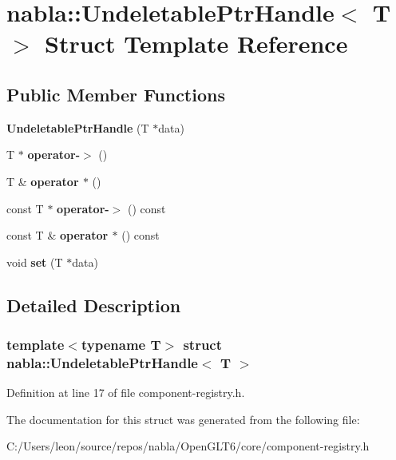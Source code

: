 \hypertarget{structnabla_1_1_undeletable_ptr_handle}{}\section{nabla\+::Undeletable\+Ptr\+Handle$<$ T $>$ Struct Template Reference}
\label{structnabla_1_1_undeletable_ptr_handle}
\subsection*{Public Member Functions}
\begin{DoxyCompactItemize}
\item 
\mbox{\label{structnabla_1_1_undeletable_ptr_handle_afd1796a0e126eefde86a3cfd2f166238}} 
{\bfseries Undeletable\+Ptr\+Handle} (T $\ast$data)
\item 
\mbox{\label{structnabla_1_1_undeletable_ptr_handle_ac8a3d97fd2186ea1d1c48041dc4fedcf}} 
T $\ast$ {\bfseries operator-\/$>$} ()
\item 
\mbox{\label{structnabla_1_1_undeletable_ptr_handle_a0d2936bd624f9b93e5772111525dab7b}} 
T \& {\bfseries operator $\ast$} ()
\item 
\mbox{\label{structnabla_1_1_undeletable_ptr_handle_a6254f505504dd4ee4d560305988e124c}} 
const T $\ast$ {\bfseries operator-\/$>$} () const
\item 
\mbox{\label{structnabla_1_1_undeletable_ptr_handle_a1cce9ea2ea5c3cb103f59c335267e7e7}} 
const T \& {\bfseries operator $\ast$} () const
\item 
\mbox{\label{structnabla_1_1_undeletable_ptr_handle_abcc6e0af30f6f48f38a7319c5e282331}} 
void {\bfseries set} (T $\ast$data)
\end{DoxyCompactItemize}


\subsection{Detailed Description}
\subsubsection*{template$<$typename T$>$\newline
struct nabla\+::\+Undeletable\+Ptr\+Handle$<$ T $>$}



Definition at line 17 of file component-\/registry.\+h.



The documentation for this struct was generated from the following file\+:\begin{DoxyCompactItemize}
\item 
C\+:/\+Users/leon/source/repos/nabla/\+Open\+G\+L\+T6/core/component-\/registry.\+h\end{DoxyCompactItemize}
